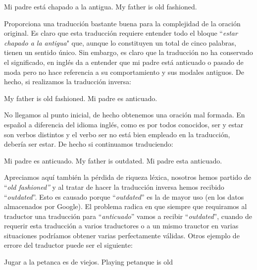 \documentclass[final]{CSP}
\begin{document}
\begin{drama}

    \espeaks Mi padre está chapado a la antigua.
    \ispeaks My father is old fashioned.
\end{drama}

Proporciona una traducción bastante buena para la complejidad de la oración original. Es claro
que esta traducción requiere entender todo el bloque ``\textit{estar chapado a la antigua}" que,
aunque lo constituyen un total de cinco palabras, tienen un sentido único. Sin embargo, es claro
que la traducción no ha conservado el significado, en inglés da a entender que mi padre está
anticuado o pasado de moda pero no hace referencia a su comportamiento y sus modales antiguos.
De hecho, si realizamos la traducción inversa:

\begin{drama}

    \ispeaks My father is old fashioned.
    \espeaks Mi padre es anticuado.
\end{drama}

No llegamos al punto inicial, de hecho obtenemos una oración mal formada. En español a diferencia
del idioma inglés, como es por todos conocidos, ser y estar son verbos distintos y el verbo ser
no está bien empleado en la traducción, debería ser estar. De hecho si continuamos traduciendo:

\begin{drama}

    \espeaks Mi padre es anticuado.
    \ispeaks My father is outdated.
    \espeaks Mi padre esta anticuado.
\end{drama}

Apreciamos aquí también la pérdida de riqueza léxica, nosotros hemos partido de ``\textit{old
fashioned''} y al tratar de hacer la traducción inversa hemos recibido ``\textit{outdated}''. Esto
es causado porque ``\textit{outdated}'' es la de mayor uso (en los datos almacenados por Google).
El problema radica en que siempre que requiramos al traductor una traducción para 
``\textit{anticuado}'' vamos a recibir ``\textit{outdated}'', cuando de requerir esta traducción a
varios traductores o a un mismo trauctor en varias situaciones podríamos obtener varias 
perfectamente válidas. Otros ejemplo de errore del traductor puede ser el siguiente:

\begin{drama}

    \espeaks Jugar a la petanca es de viejos.
    \ispeaks Playing petanque is old
\end{drama}
\end{document}
